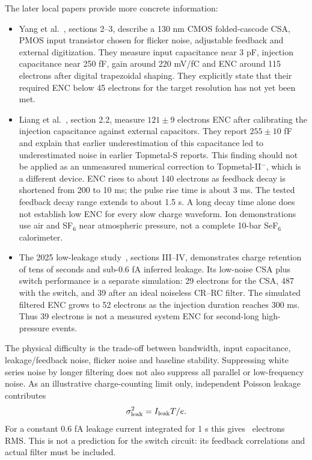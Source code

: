 \documentclass[11pt,a4paper]{article}
\begin{document}
The later local papers provide more concrete information:
\begin{itemize}
\item Yang et al.~\cite{Yang2024TopmetalCSA}, sections 2--3, describe a
130 nm CMOS folded-cascode CSA, PMOS input transistor chosen for flicker
noise, adjustable feedback and external digitization. They measure input
capacitance near 3 pF, injection capacitance near 250 fF, gain around
220 mV/fC and ENC around 115 electrons after digital trapezoidal shaping.
They explicitly state that their required ENC below 45 electrons for the
target resolution has not yet been met.
\item Liang et al.~\cite{Liang2024TopmetalS}, section 2.2, measure
$121\pm9$ electrons ENC after calibrating the injection capacitance against
external capacitors. They report $255\pm10$ fF and explain that earlier
underestimation of this capacitance led to underestimated noise in earlier
Topmetal-S reports. This finding should not be applied as an unmeasured
numerical correction to Topmetal-II$^-$, which is a different device.
ENC rises to about 140 electrons as feedback decay is shortened from
200 to 10 ms; the pulse rise time is about 3 ms. The tested feedback decay
range extends to about 1.5 s. A long decay time alone does not establish
low ENC for every slow charge waveform. Ion demonstrations use air and
SF$_6$ near atmospheric pressure, not a complete 10-bar SeF$_6$ calorimeter.
\item The 2025 low-leakage study~\cite{Wang2025LowLeakage}, sections III--IV,
demonstrates charge retention of tens of seconds and sub-0.6 fA inferred
leakage. Its low-noise CSA plus switch performance is a separate simulation:
29 electrons for the CSA, 487 with the switch, and 39 after an ideal noiseless
CR--RC filter. The simulated filtered ENC grows to 52 electrons as the
injection duration reaches 300 ms. Thus 39 electrons is not a measured
system ENC for second-long high-pressure events.
\end{itemize}

The physical difficulty is the trade-off between bandwidth, input capacitance,
leakage/feedback noise, flicker noise and baseline stability. Suppressing white
series noise by longer filtering does not also suppress all parallel or
low-frequency noise. As an illustrative charge-counting limit only, independent
Poisson leakage contributes
\begin{equation}
 \sigma_{\rm leak}^2=I_{\rm leak}T/e.
\end{equation}
For a constant 0.6 fA leakage current integrated for 1 s this gives
\LeakageShotOneSecond\ electrons RMS. This is not a prediction for the
switch circuit: its feedback correlations and actual filter must be included.
\end{document}
